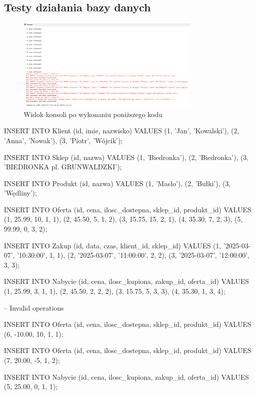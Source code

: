 \documentclass[a4paper,12pt]{article}
\begin{document}
\subsection{Testy działania bazy danych}

\begin{figure}[H]
    \centering
    \includegraphics[width=0.8\textwidth]{images/seeding_console.png}
    \caption{Widok konsoli po wykonaniu poniższego kodu}
    \label{fig:tests}
    \end{figure}

INSERT INTO Klient (id, imie, nazwisko) VALUES
(1, 'Jan', 'Kowalski'),
(2, 'Anna', 'Nowak'),
(3, 'Piotr', 'Wójcik');

INSERT INTO Sklep (id, nazwa) VALUES
(1, 'Biedronka'),
(2, 'Biedronka'),
(3, 'BIEDRONKA pl. GRUNWALDZKI');

INSERT INTO Produkt (id, nazwa) VALUES
(1, 'Masło'),
(2, 'Bułki'),
(3, 'Wędliny');

INSERT INTO Oferta (id, cena, ilosc_dostepna, sklep_id, produkt_id) VALUES
(1, 25.99, 10, 1, 1),
(2, 45.50, 5, 1, 2),
(3, 15.75, 15, 2, 1),
(4, 35.30, 7, 2, 3),
(5, 99.99, 0, 3, 2);

INSERT INTO Zakup (id, data, czas, klient_id, sklep_id) VALUES
(1, '2025-03-07', '10:30:00', 1, 1),
(2, '2025-03-07', '11:00:00', 2, 2),
(3, '2025-03-07', '12:00:00', 3, 3);

INSERT INTO Nabycie (id, cena, ilosc_kupiona, zakup_id, oferta_id) VALUES
(1, 25.99, 3, 1, 1),
(2, 45.50, 2, 2, 2),
(3, 15.75, 5, 3, 3),
(4, 35.30, 1, 3, 4);

-- Invalid operations

INSERT INTO Oferta (id, cena, ilosc_dostepna, sklep_id, produkt_id) VALUES (6, -10.00, 10, 1, 1);

INSERT INTO Oferta (id, cena, ilosc_dostepna, sklep_id, produkt_id) VALUES (7, 20.00, -5, 1, 2);

INSERT INTO Nabycie (id, cena, ilosc_kupiona, zakup_id, oferta_id) VALUES (5, 25.00, 0, 1, 1);
\end{document}
